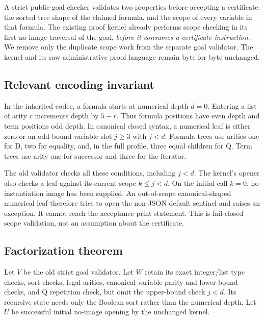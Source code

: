 \documentclass[11pt,letterpaper]{article}
\theoremstyle{definition}\newtheorem{definition}[theorem]{Definition}
\theoremstyle{remark}\newtheorem{remark}[theorem]{Remark}
\begin{document}
A strict public-goal checker validates two properties before accepting a
certificate: the sorted tree shape of the claimed formula, and the scope
of every variable in that formula. The existing proof kernel already
performs scope checking in its first no-image traversal of the goal,
\emph{before it consumes a certificate instruction}. We remove only the
duplicate scope work from the separate goal validator. The kernel and its
raw administrative proof language remain byte for byte unchanged.

\subsection{Relevant encoding invariant}
In the inherited codec, a formula starts at numerical depth \(d=0\).
Entering a list of arity \(r\) increments depth by \(5-r\). Thus formula
positions have even depth and term positions odd depth. In canonical
closed syntax, a numerical leaf is either zero or an odd bound-variable
slot \(j\geq3\) with \(j<d\). Formula trees use arities one for D,
two for equality, and, in the full profile, three equal children for Q.
Term trees use arity one for successor and three for the iterator.

The old validator checks all these conditions, including \(j<d\).
The kernel's opener also checks a leaf against its current scope
\(k\leq j<d\). On the initial call \(k=0\), no instantiation image
has been supplied. An out-of-scope canonical-shaped numerical leaf
therefore tries to open the non-JSON default sentinel and raises an
exception. It cannot reach the acceptance print statement. This is
fail-closed scope validation, not an assumption about the certificate.

\subsection{Factorization theorem}
Let \(V\) be the old strict goal validator. Let \(W\) retain its exact
integer/list type checks, sort checks, legal arities, canonical variable
parity and lower-bound checks, and Q repetition check, but omit the
upper-bound check \(j<d\). Its recursive state needs only the Boolean
sort rather than the numerical depth. Let \(U\) be successful initial
no-image opening by the unchanged kernel.
\end{document}
